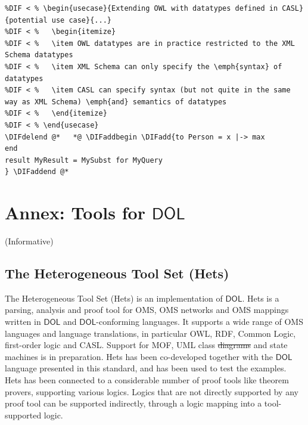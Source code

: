 \documentclass[10pt,fleqn,final]{scrreprt}
\makeatletter
\newcommand*\CommentAuthor{}
\renewcommand*\CommentAuthor{#1}}
\newcommand*\CommentDate{}
\renewcommand*\CommentDate{#1}}
\newcommand*\CommentId{}
\renewcommand*\CommentId{#1}}
\newcommand*\CommentType{}
\renewcommand*\CommentType{#1}}
\newcommand*{\SetCommentColorByType}[1]{%
\edef\localType{{#1}}%
\expandafter\ifstrequal\localType{q-aut}{\colorlet{CommentColor}{red}}{%
\expandafter\ifstrequal\localType{q-all}{\colorlet{CommentColor}{orange}}{%
\expandafter\ifstrequal\localType{todo}{\colorlet{CommentColor}{orange}}{%
\expandafter\ifstrequal\localType{fyi}{\colorlet{CommentColor}{lightgray}}{%
\colorlet{CommentColor}{yellow}}}}}}
\newcommand*{\SetCommentPrefixByType}[1]{%
\edef\localType{{#1}}%
\expandafter\@ifmtarg\localType{%
\edef\CommentPrefix{}%
}{%
\caseupper[q]{#1}%
\edef\CommentPrefix{\thestring: }%
}}
\newcommand*{\initComment}[1]{%
\setkeys{Comment}{#1}%
\SetCommentColorByType{\CommentType}%
\relax%
\SetCommentPrefixByType{\CommentType}%
\relax%
}
\newcommand*{\todonote}[2][]{%
\initComment{#1}%
\pdfcomment[author=\CommentAuthor,color=CommentColor,date=\CommentDate,id=\CommentId]{%
\CommentPrefix
#2}}
\renewcommand*{\todonote}[2][]{%
\initComment{#1}%
\ednote{\CommentPrefix #2}}
\newcommand*{\DOL}{\ensuremath{\mathsf{DOL}}\xspace}
\newcommand{\informative}[0]{{\begin{center}{\Large{(Informative})}\end{center}} \bigskip}
\newcommand{\sclause}[1]{\section{#1}}
\newcommand{\infannex}[1]{ \chapter{Annex: #1}  \informative }
\providecommand{\DIFadd}[1]{{\protect\color{blue}\uwave{#1}}} %
\providecommand{\DIFdel}[1]{{\protect\color{red}\sout{#1}}}                      %
\providecommand{\DIFaddbegin}{} %
\providecommand{\DIFaddend}{} %
\providecommand{\DIFdelbegin}{} %
\providecommand{\DIFdelend}{} %
\makeatother
\begin{document}
\begin{lstlisting}[basicstyle=\ttfamily,language=dolText,alsolanguage=CASL,escapechar=@,mathescape]
%DIFDELCMD < %%%
%DIF < % \begin{usecase}{Extending OWL with datatypes defined in CASL}{potential use case}{...}
%DIF < %   \begin{itemize}
%DIF < %   \item OWL datatypes are in practice restricted to the XML Schema datatypes
%DIF < %   \item XML Schema can only specify the \emph{syntax} of datatypes
%DIF < %   \item CASL can specify syntax (but not quite in the same way as XML Schema) \emph{and} semantics of datatypes
%DIF < %   \end{itemize}
%DIF < % \end{usecase}
\DIFdelend @*   *@ \DIFaddbegin \DIFadd{to Person = x |-> max
end
result MyResult = MySubst for MyQuery
} \DIFaddend @*
\end{lstlisting}
 


\infannex{Tools for \DOL}\label{a:tools}

\sclause{The Heterogeneous Tool Set (Hets)}\label{a:hets} The
Heterogeneous Tool Set (Hets) is  an implementation  of
\DOL. Hets is a parsing, analysis and proof tool
for OMS, OMS networks and OMS mappings written in \DOL and
\DOL-conforming languages.  It supports a wide range of OMS languages
and language translations, in particular OWL, RDF, Common Logic,
first-order logic and CASL. Support for MOF, UML class \DIFdelbegin \DIFdel{diagrams }\DIFdelend \DIFaddbegin \DIFadd{models }\DIFaddend and
state machines is in preparation.  Hets has been co-developed together
with the \DOL language presented in this standard, and has been used to
test the examples. Hets has been connected to a considerable number of
proof tools like theorem provers, supporting various logics. Logics
that are not directly supported by any proof tool can be supported
indirectly, through a logic mapping into a tool-supported logic.
\end{document}
